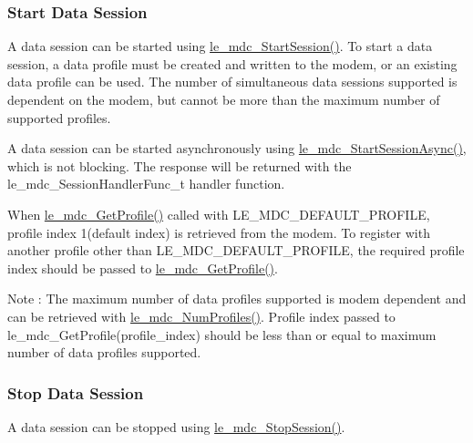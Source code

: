  \hypertarget{c_SDD_mdc_mdc_StartSession}{}\subsubsection{Start Data Session}\label{c_SDD_mdc_mdc_StartSession}
A data session can be started using \hyperlink{le__mdc__interface_8h_a2cb08d5c3e6c43297d80448891719649}{le\+\_\+mdc\+\_\+\+Start\+Session()}. To start a data session, a data profile must be created and written to the modem, or an existing data profile can be used. The number of simultaneous data sessions supported is dependent on the modem, but cannot be more than the maximum number of supported profiles.

A data session can be started asynchronously using \hyperlink{le__mdc__interface_8h_aa03d6e31263ddf8bf1d94b183c9934d9}{le\+\_\+mdc\+\_\+\+Start\+Session\+Async()}, which is not blocking. The response will be returned with the le\+\_\+mdc\+\_\+\+Session\+Handler\+Func\+\_\+t handler function.

When \hyperlink{le__mdc__interface_8h_a638b693cd5f644fa5c24f81e1e36483c}{le\+\_\+mdc\+\_\+\+Get\+Profile()} called with L\+E\+\_\+\+M\+D\+C\+\_\+\+D\+E\+F\+A\+U\+L\+T\+\_\+\+P\+R\+O\+F\+I\+LE, profile index 1(default index) is retrieved from the modem. To register with another profile other than L\+E\+\_\+\+M\+D\+C\+\_\+\+D\+E\+F\+A\+U\+L\+T\+\_\+\+P\+R\+O\+F\+I\+LE, the required profile index should be passed to \hyperlink{le__mdc__interface_8h_a638b693cd5f644fa5c24f81e1e36483c}{le\+\_\+mdc\+\_\+\+Get\+Profile()}.

\begin{DoxyNote}{Note}
\+: The maximum number of data profiles supported is modem dependent and can be retrieved with \hyperlink{le__mdc__interface_8h_a790602f1b17d7bf9626a51eac5599439}{le\+\_\+mdc\+\_\+\+Num\+Profiles()}. Profile index passed to le\+\_\+mdc\+\_\+\+Get\+Profile(profile\+\_\+index) should be less than or equal to maximum number of data profiles supported.
\end{DoxyNote}
\hypertarget{c_SDD_mdc_mdc_StopSession}{}\subsubsection{Stop Data Session}\label{c_SDD_mdc_mdc_StopSession}
A data session can be stopped using \hyperlink{le__mdc__interface_8h_a53453f85065c3cace0922150b7e3d869}{le\+\_\+mdc\+\_\+\+Stop\+Session()}.

